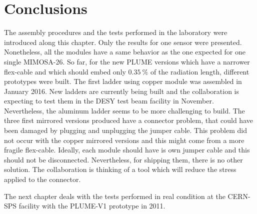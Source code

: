 \section{Conclusions}

  The assembly procedures and the tests performed in the laboratory were introduced along this chapter.
  Only the results for one sensor were presented.
  Nonetheless, all the modules have a same behavior as the one expected for one single MIMOSA-26.
  So far, for the new PLUME versions which have a narrower flex-cable and which should embed only $0.35~\%$ of the radiation length, different prototypes were built. 
  The first ladder using copper module was assembled in January 2016.
  New ladders are currently being built and the collaboration is expecting to test them in the DESY test beam facility in November.
  Nevertheless, the aluminum ladder seems to be more challenging to build.
  The three first mirrored versions produced have a connector problem, that could have been damaged by plugging and unplugging the jumper cable.
  This problem did not occur with the copper mirrored versions and this might come from a more fragile flex-cable.
  Ideally, each module should have is own jumper cable and this should not be disconnected.
  Nevertheless, for shipping them, there is no other solution.
  The collaboration is thinking of a tool which will reduce the stress applied to the connector.

  The next chapter deals with the tests performed in real condition at the CERN-SPS facility with the PLUME-V1 prototype in 2011.


